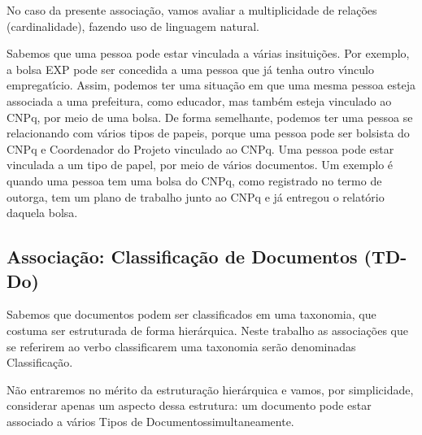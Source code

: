 \documentclass[
12pt,		%
openright,	%
twoside,  %
a4paper,			%
chapter=TITLE,		%
english,			%
french,				%
spanish,			%
brazil				%
]{USPSC-classe/USPSC}
\begin{document}
No caso da presente associa\c{c}\~ao, vamos avaliar a multiplicidade de rela\c{c}\~oes (cardinalidade), fazendo uso de linguagem natural.









Sabemos que uma pessoa pode estar vinculada a v\'arias insitui\c{c}\~oes. Por exemplo, a bolsa EXP pode ser concedida a uma pessoa que j\'a tenha outro v\'{\i}nculo empregat\'{\i}cio. Assim, podemos ter uma situa\c{c}\~ao em que uma mesma pessoa esteja associada a uma prefeitura, como educador, mas tamb\'em esteja vinculado ao CNPq, por meio de uma bolsa. De forma semelhante, podemos ter uma pessoa se relacionando com v\'arios tipos de papeis, porque uma pessoa pode ser bolsista do CNPq e Coordenador do Projeto vinculado ao CNPq. Uma pessoa pode estar vinculada a um tipo de papel, por meio de v\'arios documentos. Um exemplo \'e quando uma pessoa tem uma bolsa do CNPq, como registrado no termo de outorga, tem um plano de trabalho junto ao CNPq e j\'a entregou o relat\'orio daquela bolsa.









\subsection[Associa\c{c}\~ao: Classifica\c{c}\~ao de Documentos (TD-Do)]{Associa\c{c}\~ao: Classifica\c{c}\~ao de Documentos (TD-Do)}\label{Associa\c{c}\~ao: Classifica\c{c}\~ao de Documentos (TD-Do)}
Sabemos que documentos podem ser classificados em uma taxonomia, que costuma ser estruturada de forma hier\'arquica. Neste trabalho as associa\c{c}\~oes que se referirem ao verbo \textquotedbl classificar\textquotedbl  em uma taxonomia ser\~ao denominadas \textquotedbl Classifica\c{c}\~ao\textquotedbl .









N\~ao entraremos no m\'erito da estrutura\c{c}\~ao hier\'arquica e vamos, por simplicidade, considerar apenas um aspecto dessa estrutura: um documento pode estar associado a v\'arios \textquotedbl Tipos de Documentos\textquotedbl  simultaneamente.
\end{document}

